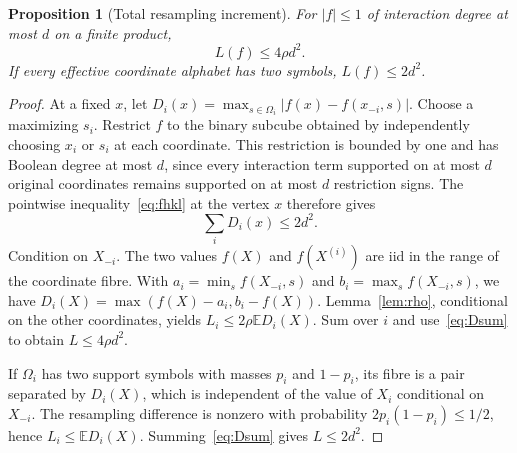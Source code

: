 \documentclass[11pt]{article}
\numberwithin{equation}{section}
\newtheorem{proposition}[theorem]{Proposition}
\theoremstyle{remark}
\newcommand{\E}{\mathbb E}
\begin{document}
\begin{proposition}[Total resampling increment]\label{prop:totalL}
For $|f|\le1$ of interaction degree at most $d$ on a finite product,
\begin{equation}\label{eq:L}
 L(f)\le4\rho d^2.
\end{equation}
If every effective coordinate alphabet has two symbols, $L(f)\le2d^2$.
\end{proposition}
\begin{proof}
At a fixed $x$, let
$D_i(x)=\max_{s\in\Omega_i}|f(x)-f(x_{-i},s)|$.
Choose a maximizing $s_i$. Restrict $f$ to the binary subcube obtained by independently choosing $x_i$ or $s_i$ at each coordinate. This restriction is bounded by one and has Boolean degree at most $d$, since every interaction term supported on at most $d$ original coordinates remains supported on at most $d$ restriction signs. The pointwise inequality~\eqref{eq:fhkl} at the vertex $x$ therefore gives
\begin{equation}\label{eq:Dsum}
 \sum_iD_i(x)\le2d^2.
\end{equation}
Condition on $X_{-i}$. The two values $f(X)$ and $f(X^{(i)})$ are iid in the range of the coordinate fibre. With $a_i=\min_sf(X_{-i},s)$ and $b_i=\max_sf(X_{-i},s)$, we have
$D_i(X)=\max(f(X)-a_i,b_i-f(X))$. Lemma~\ref{lem:rho}, conditional on the other coordinates, yields
$L_i\le2\rho\E D_i(X)$. Sum over $i$ and use~\eqref{eq:Dsum} to obtain $L\le4\rho d^2$.

If $\Omega_i$ has two support symbols with masses $p_i$ and $1-p_i$, its fibre is a pair separated by $D_i(X)$, which is independent of the value of $X_i$ conditional on $X_{-i}$. The resampling difference is nonzero with probability $2p_i(1-p_i)\le1/2$, hence $L_i\le\E D_i(X)$. Summing~\eqref{eq:Dsum} gives $L\le2d^2$.
\end{proof}
\end{document}
